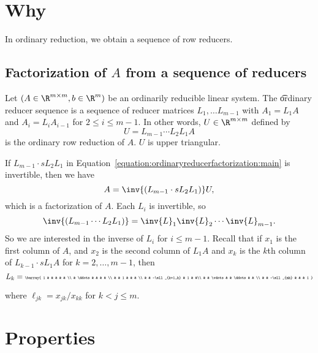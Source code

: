 

\section*{Why}

In ordinary reduction, we obtain a sequence of row reducers.

\subsection*{Factorization of $A$ from a sequence of reducers}

Let $(A \in \R ^{m \times m}, b \in \R ^{m})$ be an ordinarily reducible linear system.
The \t{ordinary reducer sequence} is a sequence of reducer matrices $L_{1}, \dots  L_{m-1}$ with $A_1 = L_1A$ and $A_i = L_iA_{i-1}$ for $2 \leq i \leq m-1$.
In other words, $U \in \R ^{m \times m}$ defined by
\begin{equation}
    \label{equation:ordinaryreducerfactorization:main}U = L_{m-1} \cdots L_2 L_1 A\end{equation}
is the ordinary row reduction of $A$.
$U$ is upper triangular.

If $L_{m-1}\cdot s L_2 L_1$ in Equation~\eqref{equation:ordinaryreducerfactorization:main} is invertible, then we have
    \[
A = \inv{(L_{m-1}\cdot s L_2 L_1)}U,
    \]
which is a factorization of $A$.
Each $L_i$ is invertible, so
    \[
\inv{(L_{m-1} \cdots L_2 L_1)} = \inv{L}_1\inv{L}_2\cdots\inv{L}_{m-1}.
    \]
So we are interested in the inverse of $L_i$ for $i \leq m-1$.
Recall that if $x_1$ is the first column of $A$, and $x_2$ is the second column of $L_1A$ and $x_k$ is the $k$th column of $L_{k-1}\cdot s L_{1}A$ for $k = 2, \dots , m-1$, then
    \[
{\tiny
L_k = \barray{
1 & & & & & \\
& \ddots & & & & \\
& & 1 & & & \\
& & -\ell _{k+1,k} & 1 & &\\
& & \vdots & & \ddots & & \\
& & -\ell _{mk} & & & 1
}
}
    \]

where $\ell _{jk} = x_{jk}/x_{kk}$ for $k < j \leq m$.
\section*{Properties}

